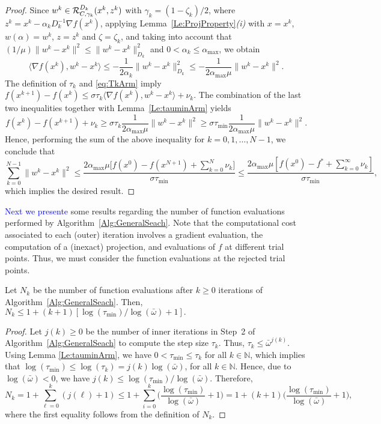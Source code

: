 \begin{proof}
	Since  $w^k \in   {\cal R}_{C,\gamma_k}^{D_k}(x^{k}, z^k)$ with    $\gamma_k=(1-\zeta_k)/2$, where $z^k = x^{k}-\alpha_k D^{-1} _k\nabla f(x^{k})$,  applying  Lemma~\ref{Le:ProjProperty}{\it (i)} with $x=x^k$, $w(\alpha) = w^k$, $z = z^k$ and $\zeta= \zeta_k$, and taking into account that $(1/\mu)  \|w^k-x^k\|^2 \leq  \|w^k-x^k\|_{D_k}^2$  and $0<\alpha_k \leq \alpha_{\max}$, we obtain
	\begin{equation*}\label{eq:fD2}
		\big\langle \nabla f(x^{k}), w^k-x^{k}\big\rangle \leq -\frac{1}{2\alpha_k} \|w^k-x^k\|_{D_k}^2\leq -\frac{1}{2\alpha_{\max}\mu} \|w^k-x^k\|^2.
	\end{equation*}
	The definition of $\tau_k$  and \eqref{eq:TkArm} imply  $f(x^{k+1}) - f(x^k) \leq \sigma\tau_k \big\langle \nabla f(x^{k}),  w^k-x^{k} \big\rangle+\nu_k$. The combination of the last two inequalities together with Lemma~\ref{Le:tauminArm} yields
	$$
		f(x^k) - f(x^{k+1})+\nu_k \geq \sigma\tau_k \frac{1}{2\alpha_{\max}\mu} \|w^k-x^k\|^2 \geq \sigma \tau_{\min} \frac{1}{2\alpha_{\max}\mu} \|w^k-x^k\|^2.
	$$
	Hence, performing the sum of the above inequality for $k= 0, 1,\ldots, N-1$, we conclude that
	$$
		\sum_{k= 0}^{N-1} \|w^k - x^k\|^2 \leq \frac{2{\alpha_{\max}}\mu \big[f(x^0) - f(x^{N+1})+ \sum_{k= 0}^{N}\nu_k\big]}{\sigma \tau_{\min}}\leq \frac{2{\alpha_{\max}}\mu \left[ f(x^0) - f^*+ \sum_{k= 0}^{\infty}\nu_k\right]}{\sigma \tau_{\min}},
	$$
	which implies the desired result.
\end{proof}
\textcolor{blue}{Next we presente} some results regarding the  number of function evaluations performed by Algorithm~\ref{Alg:GeneralSeach}.
Note that the computational cost associated to each (outer) iteration involves a gradient evaluation, the computation of a (inexact) projection, and evaluations of $f$ at different trial points.
Thus, we must consider the function evaluations at the rejected trial points.
\begin{lemma} \label{eq:nfeas}
	Let $N_{k}$ be  the number of function evaluations after $k\geq 0$ iterations of Algorithm~\ref{Alg:GeneralSeach}. Then,  $N_{k}\leq 1+ (k+1)[\log (\tau_{\min})/\log (\bar\omega)+1].$
\end{lemma}
\begin{proof}
	Let $j(k)\geq 0$ be the number of inner iterations in Step~2 of Algorithm~\ref{Alg:GeneralSeach} to compute the step size $\tau_k$.  Thus, $\tau_k\leq {\bar\omega}^{j(k)}$.
Using Lemma \ref {Le:tauminArm}, we have  $0< \tau_{\min}\leq  \tau _{k}$ for all  $k\in \mathbb{N}$, which implies that  $ \log \left( \tau_{\min} \right) \leq \log (\tau _{k})=j(k) \log (\bar\omega)$, for all $k \in \mathbb{N}$.  Hence, due to  $\log(\bar\omega) <0$, we have $ j(k) \leq \log (\tau_{\min})/\log (\bar\omega)$. Therefore,
	$$
	N_k =	1+ \sum _{\ell=0}^{k}(j(\ell)+1)\leq 1+  \sum _{i=0}^{k} \Big(\frac{\log (\tau_{\min})}{\log (\bar\omega)} +1\Big)= 1+(k+1) \Big(\frac{\log (\tau_{\min})}{\log (\bar\omega)}+1\Big),
	$$
	where the first equality follows from the definition of $N_k$.
\end{proof}
